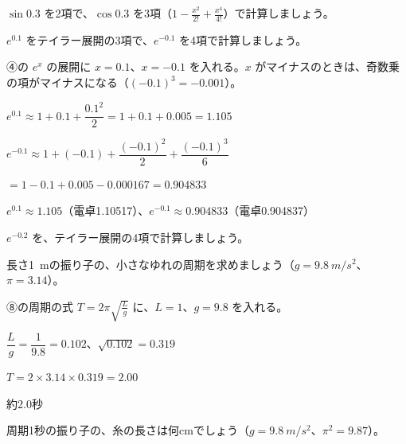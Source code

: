 \begin{jibun}
$\sin0.3$ を2項で、$\cos0.3$ を3項（$1-\frac{x^2}{2!}+\frac{x^4}{4!}$）で計算しましょう。
\end{jibun}

\begin{reidai}[$e^x$ の値を計算する]
$e^{0.1}$ をテイラー展開の3項で、$e^{-0.1}$ を4項で計算しましょう。\par
\kangaekata ④の $e^x$ の展開に $x=0.1$、$x=-0.1$ を入れる。$x$ がマイナスのときは、奇数乗の項がマイナスになる（$(-0.1)^3=-0.001$）。\par
\shiki $e^{0.1}\approx1+0.1+\dfrac{0.1^2}{2}=1+0.1+0.005=1.105$\par
\hspace*{2.6\zw}$e^{-0.1}\approx1+(-0.1)+\dfrac{(-0.1)^2}{2}+\dfrac{(-0.1)^3}{6}$\par
\hspace*{4.6\zw}$=1-0.1+0.005-0.000167=0.904833$\par
\kotae $e^{0.1}\approx1.105$（電卓1.10517）、$e^{-0.1}\approx0.904833$（電卓0.904837）
\end{reidai}

\begin{jibun}
$e^{-0.2}$ を、テイラー展開の4項で計算しましょう。
\end{jibun}

\begin{reidai}[振り子の周期]
長さ\qty{1}{m}の振り子の、小さなゆれの周期を求めましょう（$g=\qty{9.8}{m/s^2}$、$\pi=3.14$）。\par
\kangaekata ⑧の周期の式 $T=2\pi\sqrt{\frac{L}{g}}$ に、$L=1$、$g=9.8$ を入れる。\par
\shiki $\dfrac{L}{g}=\dfrac{1}{9.8}=0.102$、$\sqrt{0.102}=0.319$\par
\hspace*{2.6\zw}$T=2\times3.14\times0.319=2.00$\par
\kotae 約2.0秒
\end{reidai}

\begin{jibun}
周期1秒の振り子の、糸の長さは何cmでしょう（$g=\qty{9.8}{m/s^2}$、$\pi^2=9.87$）。
\end{jibun}

